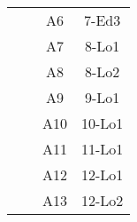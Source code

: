 \begin{longtable}[c]{cccc}
\multicolumn{1}{|c|}{}                                    & \multicolumn{1}{c|}{}                                                                                                                          & \multicolumn{1}{c|}{\cellcolor[HTML]{34CDF9}A6}    & \multicolumn{1}{c|}{7-Ed3}                               \\ \cline{3-4} 
\multicolumn{1}{|c|}{}                                    & \multicolumn{1}{c|}{}                                                                                                                          & \multicolumn{1}{c|}{\cellcolor[HTML]{80EDF3}A7}    & \multicolumn{1}{c|}{8-Lo1}                               \\ \cline{3-4} 
\multicolumn{1}{|c|}{}                                    & \multicolumn{1}{c|}{}                                                                                                                          & \multicolumn{1}{c|}{\cellcolor[HTML]{34CDF9}A8}    & \multicolumn{1}{c|}{8-Lo2}                               \\ \cline{3-4} 
\multicolumn{1}{|c|}{}                                    & \multicolumn{1}{c|}{}                                                                                                                          & \multicolumn{1}{c|}{\cellcolor[HTML]{80EDF3}A9}    & \multicolumn{1}{c|}{9-Lo1}                               \\ \cline{3-4} 
\multicolumn{1}{|c|}{}                                    & \multicolumn{1}{c|}{}                                                                                                                          & \multicolumn{1}{c|}{\cellcolor[HTML]{34CDF9}A10}   & \multicolumn{1}{c|}{10-Lo1}                              \\ \cline{3-4} 
\multicolumn{1}{|c|}{}                                    & \multicolumn{1}{c|}{}                                                                                                                          & \multicolumn{1}{c|}{\cellcolor[HTML]{80EDF3}A11}   & \multicolumn{1}{c|}{11-Lo1}                              \\ \cline{3-4} 
\multicolumn{1}{|c|}{}                                    & \multicolumn{1}{c|}{}                                                                                                                          & \multicolumn{1}{c|}{\cellcolor[HTML]{34CDF9}A12}   & \multicolumn{1}{c|}{12-Lo1}                              \\ \cline{3-4} 
\multicolumn{1}{|c|}{}                                    & \multicolumn{1}{c|}{}                                                                                                                          & \multicolumn{1}{c|}{\cellcolor[HTML]{80EDF3}A13}   & \multicolumn{1}{c|}{12-Lo2}                              \\ \cline{3-4} 

\end{longtable}
